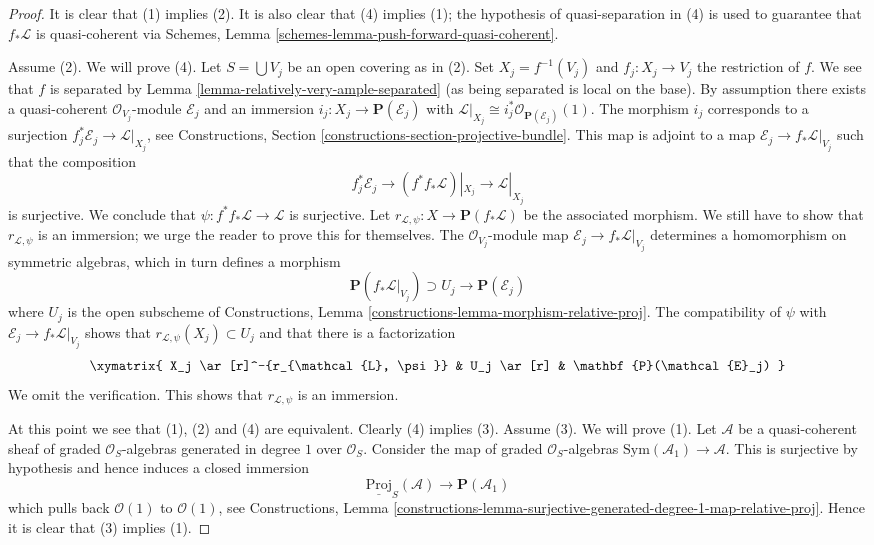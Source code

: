 \begin{proof}
It is clear that (1) implies (2). It is also clear that
(4) implies (1); the hypothesis of quasi-separation
in (4) is used to guarantee that $f_*\mathcal{L}$ is quasi-coherent via
Schemes, Lemma \ref{schemes-lemma-push-forward-quasi-coherent}.

\medskip\noindent
Assume (2). We will prove (4).
Let $S = \bigcup V_j$ be an open covering as in (2).
Set $X_j = f^{-1}(V_j)$ and $f_j : X_j \to V_j$ the
restriction of $f$. We see that $f$ is separated by
Lemma \ref{lemma-relatively-very-ample-separated} (as being
separated is local on the base). By assumption there exists a
quasi-coherent $\mathcal{O}_{V_j}$-module $\mathcal{E}_j$ and an immersion
$i_j : X_j \to \mathbf{P}(\mathcal{E}_j)$ with
$\mathcal{L}|_{X_j} \cong i_j^*\mathcal{O}_{\mathbf{P}(\mathcal{E}_j)}(1)$.
The morphism $i_j$ corresponds to a surjection
$f_j^*\mathcal{E}_j \to \mathcal{L}|_{X_j}$, see
Constructions, Section \ref{constructions-section-projective-bundle}.
This map is adjoint to a map $\mathcal{E}_j \to f_*\mathcal{L}|_{V_j}$
such that the composition
$$
f_j^*\mathcal{E}_j \to (f^*f_*\mathcal{L})|_{X_j} \to \mathcal{L}|_{X_j}
$$
is surjective. We conclude that
$\psi : f^*f_*\mathcal{L} \to \mathcal{L}$ is surjective. Let
$r_{\mathcal{L}, \psi} : X \to \mathbf{P}(f_*\mathcal{L})$ be the
associated morphism. We still have to show that $r_{\mathcal{L}, \psi}$
is an immersion; we urge the reader to prove this for themselves.
The $\mathcal{O}_{V_j}$-module map $\mathcal{E}_j \to f_*\mathcal{L}|_{V_j}$
determines a homomorphism on symmetric algebras, which in turn defines a
morphism
$$
\mathbf{P}(f_*\mathcal{L}|_{V_j}) \supset U_j \longrightarrow
\mathbf{P}(\mathcal{E}_j)
$$
where $U_j$ is the open subscheme of
Constructions, Lemma \ref{constructions-lemma-morphism-relative-proj}.
The compatibility of $\psi$ with $\mathcal{E}_j \to f_*\mathcal{L}|_{V_j}$
shows that $r_{\mathcal{L}, \psi}(X_j) \subset U_j$ and that there is a
factorization
$$
\xymatrix{
X_j \ar[r]^-{r_{\mathcal{L}, \psi}} & U_j \ar[r] &
\mathbf{P}(\mathcal{E}_j)
}
$$
We omit the verification.
This shows that $r_{\mathcal{L}, \psi}$ is an immersion.

\medskip\noindent
At this point we see that (1), (2) and (4) are equivalent.
Clearly (4) implies (3). Assume (3). We will prove (1).
Let $\mathcal{A}$ be a quasi-coherent sheaf of graded $\mathcal{O}_S$-algebras
generated in degree $1$ over $\mathcal{O}_S$. Consider the map of
graded $\mathcal{O}_S$-algebras $\text{Sym}(\mathcal{A}_1) \to \mathcal{A}$.
This is surjective by hypothesis and hence induces a closed immersion
$$
\underline{\text{Proj}}_S(\mathcal{A})
\longrightarrow
\mathbf{P}(\mathcal{A}_1)
$$
which pulls back $\mathcal{O}(1)$ to $\mathcal{O}(1)$,
see Constructions, Lemma
\ref{constructions-lemma-surjective-generated-degree-1-map-relative-proj}.
Hence it is clear that (3) implies (1).
\end{proof}

